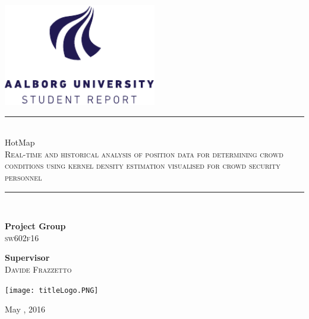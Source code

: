 \begin{titlepage}
\begin{center}
\newcommand{\HRule}{\rule{\linewidth}{0.5mm}}

\includegraphics[width=0.5\textwidth]{figures/aau_logo_en.pdf}~\\[1cm]


\vspace{0.5em}
\HRule \\[0.1cm]
{
\Huge HotMap \\\large\textsc{Real-time and historical analysis of position data for determining crowd conditions using kernel density estimation visualised for crowd security personnel}\\
}

\HRule \\[1.5cm]

\begin{minipage}{0.4\textwidth}
\begin{flushleft} \large
\textbf{Project Group}\\
\textsc{sw602f16}
\end{flushleft}
\end{minipage}
\begin{minipage}{0.4\textwidth}
\begin{flushright} \large
\textbf{Supervisor} \\
\textsc{Davide Frazzetto}
\end{flushright}
\end{minipage}

\begin{center}
\texttt{[image: titleLogo.PNG]}
\end{center}


\vfill

{\large May , 2016}

\end{center}
\end{titlepage}

